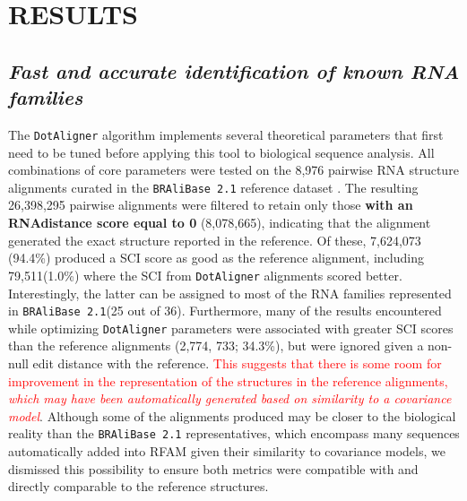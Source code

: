 \documentclass[a4paper,twoside]{article}
\newcommand\dotaligner{\texttt{DotAligner}}
\newcommand\bralibase{\texttt{BRAliBase 2.1}}
\newcommand{\RED}[1]{\textcolor{red}{#1}}
\begin{document}
\section{\uppercase{Results}}
\subsection*{\textit{Fast and accurate identification of known RNA families }}
The \dotaligner{} algorithm implements several theoretical parameters that first need to 
be tuned before applying this tool to biological sequence analysis. All combinations of 
core parameters were tested on the 8,976 pairwise RNA structure alignments  curated in the 
\bralibase{} reference dataset \cite{Wilm2006enhanced}.  The resulting 26,398,295 pairwise alignments were filtered to retain only those \textbf{with an 
RNAdistance score equal to 0 }(8,078,665), indicating that the 
 alignment generated the exact structure reported in the reference.  Of these, 
7,624,073 (94.4\%) produced a SCI score as good as the reference alignment, 
including 79,511(1.0\%) where the SCI from \dotaligner{} alignments scored better. 
Interestingly, the latter can be assigned to most of the RNA families represented 
in \bralibase   (25 out of 36). Furthermore, 
many of the results encountered while optimizing \dotaligner{} parameters were 
associated with greater SCI scores than the reference alignments (2,774, 733; 34.3\%), 
but were ignored given a non-null edit distance with the reference. 
\RED{This  suggests that there is some room for improvement in the representation of the structures in the reference alignments, \emph{which may have been automatically generated based on similarity to a covariance model}}. 
Although some of the alignments produced may be closer to the biological reality 
than the \bralibase{} representatives, which encompass many sequences automatically 
added into RFAM given their similarity to covariance models, we dismissed this 
possibility to ensure both metrics were compatible with and directly comparable 
to the reference structures. 
\end{document}
